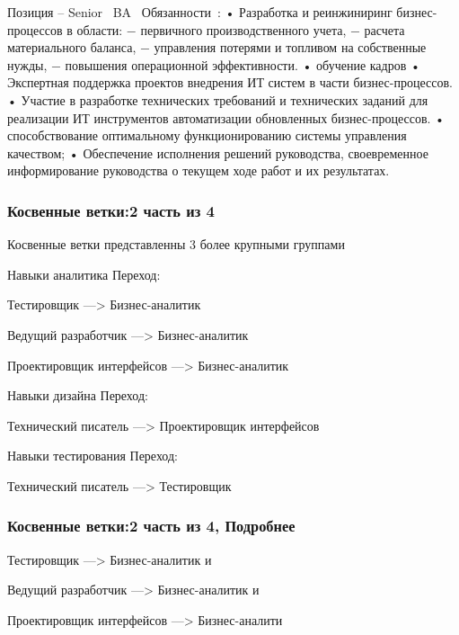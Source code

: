 \documentclass{../industrial-development}
\begin{document}
{\lecturenotes
Позиция – Senior~\cite{hh} BA~\cite{itcf}
Обязанности~\cite{rab}:
•	Разработка и реинжиниринг бизнес-процессов в области:
− первичного производственного учета,
− расчета материального баланса,
− управления потерями и топливом на собственные нужды,
− повышения операционной эффективности.
•         обучение кадров
•	Экспертная поддержка проектов внедрения ИТ систем в части бизнес-процессов.
•	Участие в разработке технических требований и технических заданий для реализации ИТ инструментов автоматизации обновленных бизнес-процессов.  
•	способствование оптимальному функционированию системы управления качеством;
•	Обеспечение исполнения решений руководства, своевременное информирование руководства о текущем ходе работ и их результатах.






\begin{frame} \frametitle{Косвенные ветки:2 часть из 4}
 \begin{block}{}
Косвенные ветки представленны 3 более крупными группами
  \end{block}
  
\begin{block}{}
 \alert{Навыки аналитика} Переход: 

Тестировщик ---> Бизнес-аналитик

Ведущий разработчик ---> Бизнес-аналитик

Проектировщик интерфейсов ---> Бизнес-аналитик
  \end{block}

 \begin{block}{}
 \alert{Навыки дизайна} Переход: 

Технический писатель ---> Проектировщик интерфейсов
  \end{block}

\begin{block}{}
 \alert{Навыки тестирования} Переход: 

Технический писатель ---> Тестировщик
  \end{block}
\end{frame}


\begin{frame} \frametitle{Косвенные ветки:2 часть из 4, Подробнее}

\begin{block}{Тестировщик ---> Бизнес-аналитик  и

Ведущий разработчик ---> Бизнес-аналитик  и

Проектировщик интерфейсов ---> Бизнес-аналити}


\end{block}
\end{frame}}
\end{document}
